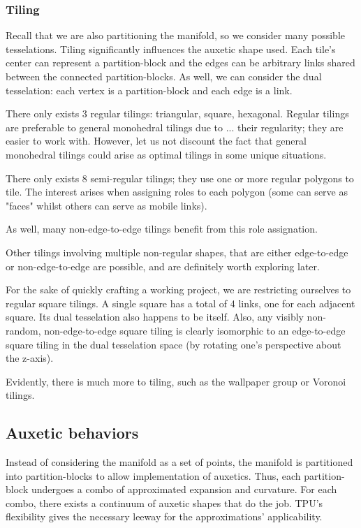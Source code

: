 \documentclass{article}
\begin{document}
\subsubsection{Tiling}
Recall that we are also partitioning the manifold, so we consider many possible tesselations. Tiling significantly influences the auxetic shape used. Each tile's center can represent a partition-block and the edges can be arbitrary links shared between the connected partition-blocks. As well, we can consider the dual tesselation: each vertex is a partition-block and each edge is a link.

There only exists 3 regular tilings: triangular, square, hexagonal. Regular tilings are preferable to general monohedral tilings due to ... their regularity; they are easier to work with. However, let us not discount the fact that general monohedral tilings could arise as optimal tilings in some unique situations.

There only exists 8 semi-regular tilings; they use one or more regular polygons to tile. The interest arises when assigning roles to each polygon (some can serve as "faces" whilst others can serve as mobile links).

As well, many non-edge-to-edge tilings benefit from this role assignation.

Other tilings involving multiple non-regular shapes, that are either edge-to-edge or non-edge-to-edge are possible, and are definitely worth exploring later.

For the sake of quickly crafting a working project, we are restricting ourselves to regular square tilings. A single square has a total of 4 links, one for each adjacent square. Its dual tesselation also happens to be itself. Also, any visibly non-random, non-edge-to-edge square tiling is clearly isomorphic to an edge-to-edge square tiling in the dual tesselation space (by rotating one's perspective about the z-axis).

Evidently, there is much more to tiling, such as the wallpaper group or Voronoi tilings.

\subsection{Auxetic behaviors}
Instead of considering the manifold as a set of points, the manifold is partitioned into partition-blocks to allow implementation of auxetics. Thus, each partition-block undergoes a combo of approximated expansion and curvature. For each combo, there exists a continuum of auxetic shapes that do the job. TPU's flexibility gives the necessary leeway for the approximations' applicability.
\end{document}
